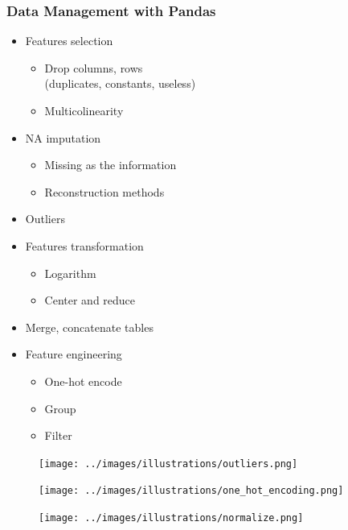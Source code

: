 \begin{frame}\frametitle{Data Management with Pandas}
   \begin{minipage}{0.56\linewidth}
      \begin{itemize}
         \item Features selection
         \begin{itemize}
            \item Drop columns, rows\\
            (duplicates, constants, useless)
            \item Multicolinearity
         \end{itemize}
         \item NA imputation
         \begin{itemize}
            \item Missing as the information
            \item Reconstruction methods
         \end{itemize}
         \item Outliers
         \item Features transformation
         \begin{itemize}
            \item Logarithm
            \item Center and reduce
         \end{itemize}
         \item Merge, concatenate tables
         \item Feature engineering
         \begin{itemize}
            \item One-hot encode
            \item Group
            \item Filter
         \end{itemize}
      \end{itemize}
   \end{minipage}
   \begin{minipage}{0.4\linewidth}
      \begin{figure}[H]
         \texttt{[image: ../images/illustrations/outliers.png]}
      \end{figure}
      \begin{figure}[H]
         \texttt{[image: ../images/illustrations/one\_hot\_encoding.png]}
      \end{figure}
      \begin{figure}[H]
         \texttt{[image: ../images/illustrations/normalize.png]}
      \end{figure}
   \end{minipage}
\end{frame}



